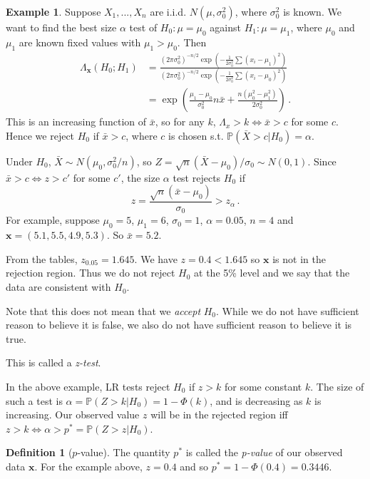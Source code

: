 \documentclass[a4paper,11pt]{article}
\theoremstyle{definition}
\newtheorem*{defn}{Definition}
\newtheorem*{ex}{Example}
\numberwithin{equation}{section}
\begin{document}
\begin{ex}
Suppose $X_1,...,X_n$ are i.i.d. $N(\mu,\sigma_0^2)$, where $\sigma_0^2$ is known. We want to find the best size $\alpha$ test of $H_0:\mu=\mu_0$ against $H_1:\mu=\mu_1$, where $\mu_0$ and $\mu_1$ are known fixed values with $\mu_1>\mu_0$. Then
\begin{align*}
    \Lambda_\mathbf{x}(H_0;H_1)&=\frac{(2\pi\sigma_0^2)^{-n/2}\exp\left(-\frac{1}{2\sigma_0^2}\sum(x_i-\mu_1)^2\right)}{(2\pi\sigma_0^2)^{-n/2}\exp\left(-\frac{1}{2\sigma_0^2}\sum(x_i-\mu_0)^2\right)}\\
    &=\exp\left(\frac{\mu_1-\mu_0}{\sigma_0^2}n\bar{x}+\frac{n(\mu_0^2-\mu_1^2)}{2\sigma_0^2}\right)\,.
\end{align*}
This is an increasing function of $\bar{x}$, so for any $k$, $\Lambda_x>k\Leftrightarrow\bar{x}>c$ for some $c$. Hence we reject $H_0$ if $\bar{x}>c$, where $c$ is chosen s.t. $\mathbb{P}(\bar{X}>c|H_0)=\alpha$.

Under $H_0$, $\bar{X}\sim N(\mu_0,\sigma_0^2/n)$, so $Z=\sqrt{n}(\bar{X}-\mu_0)/\sigma_0\sim N(0,1)$. Since $\bar{x}>c\Leftrightarrow z>c'$ for some $c'$, the size $\alpha$ test rejects $H_0$ if 
\[
z=\frac{\sqrt{n}(\bar{x}-\mu_0)}{\sigma_0}>z_\alpha\,.
\]
For example, suppose $\mu_0=5$, $\mu_1=6$, $\sigma_0=1$, $\alpha=0.05$, $n=4$ and $\mathbf{x}=(5.1,5.5,4.9,5.3)$. So $\bar{x}=5.2$.

From the tables, $z_{0.05}=1.645$. We have $z=0.4<1.645$ so $\mathbf{x}$ is not in the rejection region. Thus we do not reject $H_0$ at the 5\%  level and we say that the data are consistent with $H_0$.

Note that this does not mean that we \emph{accept} $H_0$. While we do not have sufficient reason to believe it is false, we also do not have sufficient reason to believe it is true.

This is called a \emph{z-test}.
\end{ex}

In the above example, LR tests reject $H_0$ if $z>k$ for some constant $k$. The size of such a test is $\alpha=\mathbb{P}(Z>k|H_0)=1-\Phi(k)$, and is decreasing as $k$ is increasing. Our observed value $z$ will be in the rejected region iff $z>k\Leftrightarrow\alpha>p^*=\mathbb{P}(Z>z|H_0)$.

\begin{defn}[$p$-value]
The quantity $p^*$ is called the \emph{p-value} of our observed data $\mathbf{x}$. For the example above, $z=0.4$ and so $p^*=1-\Phi(0.4)=0.3446$.
\end{defn}
\end{document}
